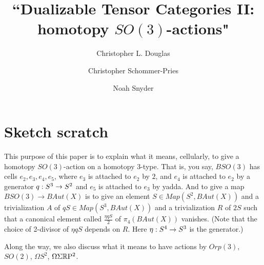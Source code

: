 \documentclass{amsart}
\begin{document}
\title{``Dualizable Tensor Categories II: homotopy $SO(3)$-actions"}

\author{Christopher L. Douglas}
\address{Mathematical Institute\\ University of Oxford\\ Oxford OX1 3LB\\ United Kingdom}
      	
\author{Christopher Schommer-Pries}
\address{Department of Mathematics\\ Massachusetts Institute of Technology\\ Cambridge, MA 02139\\ USA}

\author{Noah Snyder}
\address{Department of Mathematics\\ Columbia University\\ New York, NY 10027\\ USA}


\maketitle

\tableofcontents

\section*{Sketch scratch}

This purpose of this paper is to explain what it means, cellularly, to give a homotopy $SO(3)$-action on a homotopy 3-type.  That is, you say, $BSO(3)$ has cells $e_2, e_3, e_4, e_5$, where $e_3$ is attached to $e_2$ by $2$, and $e_4$ is attached to $e_2$ by a generator $q: S^3 \rightarrow S^2$ and $e_5$ is attached to $e_3$ by yadda.  And to give a map $BSO(3) \rightarrow BAut(X)$ is to give an element $S \in Map(S^2,BAut(X))$ and a trivialization $A$ of $q S \in Map(S^3,BAut(X))$ and a trivialization $R$ of $2S$ such that a canonical element called $\frac{\eta q S}{2}$ of $\pi_4(BAut(X))$ vanishes.  (Note that the choice of 2-divisor of $\eta q S$ depends on $R$.  Here $\eta: S^4 \rightarrow S^3$ is the generator.)

Along the way, we also discuss what it means to have actions by $Orp(3)$, $SO(2)$, $\Omega S^2$, $\Omega \Sigma \mathbb R \mathrm{P}^2$.
\end{document}
